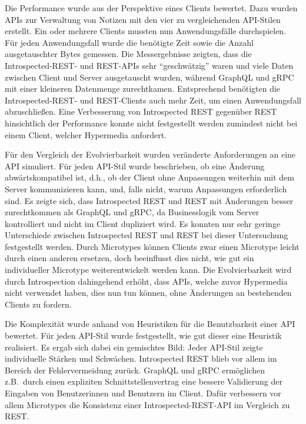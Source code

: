 Die Performance wurde aus der Perspektive eines Clients bewertet. Dazu wurden APIs zur Verwaltung von Notizen mit den vier zu vergleichenden API-Stilen erstellt. Ein oder mehrere Clients mussten nun Anwendungsfälle durchspielen. Für jeden Anwendungsfall wurde die benötigte Zeit sowie die Anzahl ausgetauschter Bytes gemessen. Die Messergebnisse zeigten, dass die Introspected-REST- und REST-APIs sehr \enquote{geschwätzig} waren und viele Daten zwischen Client und Server ausgetauscht wurden, während GraphQL und gRPC mit einer kleineren Datenmenge zurechtkamen. Entsprechend benötigten die Introspected-REST- und REST-Clients auch mehr Zeit, um einen Anwendungsfall abzuschließen. Eine Verbesserung von Introspected REST gegenüber REST hinsichtlich der Performance konnte nicht festgestellt werden \textendash{} zumindest nicht bei einem Client, welcher Hypermedia anfordert.

Für den Vergleich der Evolvierbarkeit wurden veränderte Anforderungen an eine API simuliert. Für jeden API-Stil wurde beschrieben, ob eine Änderung abwärtskompatibel ist, d.h., ob der Client ohne Anpassungen weiterhin mit dem Server kommunizieren kann, und, falls nicht, warum Anpassungen erforderlich sind. Es zeigte sich, dass Introspected REST und REST mit Änderungen besser zurechtkommen als GraphQL und gRPC, da Businesslogik vom Server kontrolliert und nicht im Client dupliziert wird. Es konnten nur sehr geringe Unterschiede zwischen Introspected REST und REST bei dieser Untersuchung festgestellt werden. Durch Microtypes können Clients zwar einen Microtype leicht durch einen anderen ersetzen, doch beeinflusst dies nicht, wie gut ein individueller Microtype weiterentwickelt werden kann. Die Evolvierbarkeit wird durch Introspection dahingehend erhöht, dass APIs, welche zuvor Hypermedia nicht verwendet haben, dies nun tun können, ohne Änderungen an bestehenden Clients zu fordern.

Die Komplexität wurde anhand von Heuristiken für die Benutzbarkeit einer API bewertet. Für jeden API-Stil wurde festgestellt, wie gut dieser eine Heuristik realisiert. Es ergab sich dabei ein gemischtes Bild: Jeder API-Stil zeigte individuelle Stärken und Schwächen. Introspected REST blieb vor allem im Bereich der Fehlervermeidung zurück. GraphQL und gRPC ermöglichen z.B.\ durch einen expliziten Schnittstellenvertrag eine bessere Validierung der Eingaben von Benutzerinnen und Benutzern im Client. Dafür verbessern vor allem Microtypes die Konsistenz einer Introspected-REST-API im Vergleich zu REST.

